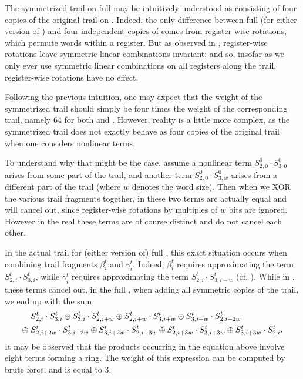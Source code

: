 \documentclass{llncs}
\begin{document}
The symmetrized trail on full  may be intuitively understood as consisting of four copies of the original trail on . Indeed, the only difference between full  (for either version of ) and four independent copies of  comes from register-wise rotations, which permute words within a register. But as observed in , register-wise rotations leave symmetric linear combinations invariant; and so, insofar as we only ever use symmetric linear combinations on all registers along the trail, register-wise rotations have no effect.

Following the previous intuition, one may expect that the weight of the symmetrized trail should simply be four times the weight of the corresponding  trail, namely 64 for both  and . However, reality is a little more complex, as the symmetrized trail does not exactly behave as four copies of the original trail when one considers nonlinear terms.

To understand why that might be the case, assume a nonlinear term $S^0_{2,0} \cdot S^0_{3,0}$ arises from some part of the trail, and another term $S^0_{2,0} \cdot S^0_{3,w}$ arises from a different part of the trail (where $w$ denotes the word size). Then when we XOR the various trail fragments together, in  these two terms are actually equal and will cancel out, since register-wise rotations by multiples of $w$ bits are ignored. However in the real  these terms are of course distinct and do not cancel each other.

In the actual trail for (either version of) full , this exact situation occurs when combining trail fragments $\beta^t_i$ and $\gamma^t_i$. Indeed, $\beta^t_i$ requires approximating the term $S^t_{2,i} \cdot S^t_{3,i}$, while $\gamma^t_i$ requires approximating the term $S^t_{2,i} \cdot S^t_{3,i-w}$ (cf. ). While in , these terms cancel out, in the full , when adding all symmetric copies of the trail, we end up with the sum:
\begin{align}
&S^t_{2,i} \cdot S^t_{3,i} \oplus S^t_{3,i} \cdot S^t_{2,i+w}
\oplus S^t_{2,i+w} \cdot S^t_{3,i+w} \oplus S^t_{3,i+w} \cdot S^t_{2,i+2w}\notag\\
\oplus\; &S^t_{2,i+2w} \cdot S^t_{3,i+2w} \oplus S^t_{3,i+2w} \cdot S^t_{2,i+3w}
\oplus S^t_{2,i+3w} \cdot S^t_{3,i+3w} \oplus S^t_{3,i+3w} \cdot S^t_{2,i}.\label{eq:8circle}
\end{align}
It may be observed that the products occurring in the equation above involve eight terms forming a ring. The weight of this expression can be computed by brute force, and is equal to $3$.
\end{document}
